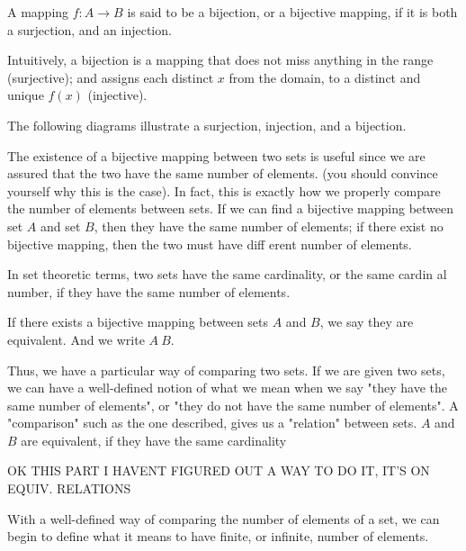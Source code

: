 \documentclass[../../templates/section]{subfiles}
\begin{document}
\begin{definition}
\begin{definition}
A mapping $f:A\rightarrow B$ is said to be a bijection, or a bijective mapping, if
it is both a surjection, and an injection.
\end{definition} 

Intuitively, a bijection is a mapping that does not miss anything in the range 
(surjective); and assigns each distinct $x$ from the domain, to a distinct and 
unique $f(x)$ (injective). 

The following diagrams illustrate a surjection, injection, and a bijection.

The existence of a bijective mapping between two sets is useful since we are 
assured that the two have the same number of elements. 
(you should convince yourself why this is the case). In fact, this is exactly 
how we properly compare the number of elements between sets. If we can find a 
bijective mapping between set $A$ and set $B$, then they have the same number 
of elements; if there exist no bijective mapping, then the two must have diff
erent number of elements. 

In set theoretic terms, two sets have the same cardinality, or the same cardin
al number, if they have the same number of elements.

\begin{definition}
If there exists a bijective mapping between sets $A$ and $B$, we say they are 
equivalent. And we write $A~B$.
\end{definition}

Thus, we have a particular way of comparing two sets. If we are given two sets, 
we can have a well-defined notion of what we mean when we say 
"they have the same number of elements", or 
"they do not have the same number of elements". 
A "comparison" such as the one described, gives us a "relation" between sets. 
$A$ and $B$ are equivalent, if they have the same cardinality

OK THIS PART I HAVENT FIGURED OUT A WAY TO DO IT, IT'S ON EQUIV. RELATIONS

With a well-defined way of comparing the number of elements of a set, we can
 begin to define what it means to have finite, or infinite, number of elements.


\end{definition}
\end{document}
